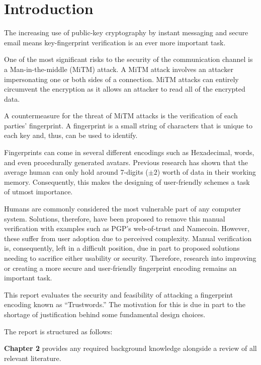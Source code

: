 \chapter{Introduction}
\label{cha:Introduction}

The increasing use of public-key cryptography by instant messaging and secure email means key-fingerprint  verification is an ever more important task. 

One of the most significant risks to the security of the communication channel is a Man-in-the-middle (MiTM) attack. A MiTM attack involves an attacker impersonating one or both sides of a connection. MiTM attacks can entirely circumvent the encryption as it allows an attacker to read all of the encrypted data. 

A countermeasure for the threat of MiTM attacks is the verification of each parties’ fingerprint. A fingerprint is a small string of characters that is unique to each key and, thus, can be used to identify.

Fingerprints can come in several different encodings such as Hexadecimal, words, and even procedurally generated avatars. Previous research has shown that the average human can only hold around 7-digits ($\pm 2$) worth of data in their working memory\cite{miller1956magical}. Consequently, this makes the designing of user-friendly schemes a task of utmost importance.

Humans are commonly considered the most vulnerable part of any computer system. Solutions, therefore, have been proposed to remove this manual verification with examples such as PGP's web-of-trust\cite{callas1998openpgp} and Namecoin\cite{kalodner2015empirical}. However, these suffer from user adoption due to perceived complexity. Manual verification is, consequently, left in a difficult position, due in part to proposed solutions needing to sacrifice either usability or security. Therefore, research into improving or creating a more secure and user-friendly fingerprint encoding remains an important task.

This report evaluates the security and feasibility of attacking a fingerprint encoding known as “Trustwords.” The motivation for this is due in part to the shortage of justification behind some fundamental design choices.

The report is structured as follows:

\textbf{Chapter 2} provides any required background knowledge alongside a review of all relevant literature.

